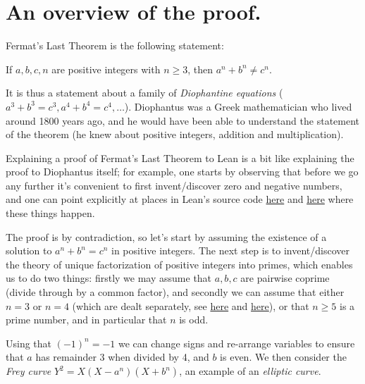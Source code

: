 \chapter{An overview of the proof.}

Fermat's Last Theorem is the following statement:

\begin{theorem} 
If $a,b,c,n$ are positive integers with $n\geq 3$, then $a^n+b^n\not=c^n$.
\end{theorem}

It is thus a statement about a family of \emph{Diophantine equations} ($a^3+b^3=c^3, a^4+b^4=c^4,\ldots$). Diophantus was a Greek mathematician who lived around 1800 years ago, and he would have been able to understand the statement of the theorem (he knew about positive integers, addition and multiplication).

Explaining a proof of Fermat's Last Theorem to Lean is a bit like explaining the proof to Diophantus itself; for example, one starts by observing that before we go any further it's convenient to first invent/discover zero and negative numbers, and one can point explicitly at places in Lean's source code \href{https://github.com/leanprover/lean4/blob/260eaebf4e804c9ac1319532970544a4e157c336/src/Init/Prelude.lean#L1049}{here} and \href{https://github.com/leanprover/lean4/blob/260eaebf4e804c9ac1319532970544a4e157c336/src/Init/Data/Int/Basic.lean#L45}{here} where these things happen.

The proof is by contradiction, so let's start by assuming the existence of a solution to $a^n+b^n=c^n$ in positive integers. The next step is to invent/discover the theory of unique factorization of positive integers into primes, which enables us to do two things: firstly we may assume that $a,b,c$ are pairwise coprime (divide through by a common factor), and secondly we can assume that either $n=3$ or $n=4$ (which are dealt separately, see \href{https://github.com/leanprover-community/flt-regular/blob/1eac0e08635793fd9f373ee789620ca7266bc6b8/FltRegular/FltThree/FltThree.lean#L718-L728}{here} and \href{docs#fermatLastTheoremFour}{here}), or that $n\geq 5$ is a prime number, and in particular that $n$ is odd.

Using that $(-1)^n=-1$ we can change signs and re-arrange variables to ensure that $a$ has remainder 3 when divided by 4, and $b$ is even. We then consider the \emph{Frey curve} $Y^2=X(X-a^n)(X+b^n)$, an example of an \emph{elliptic curve}.


